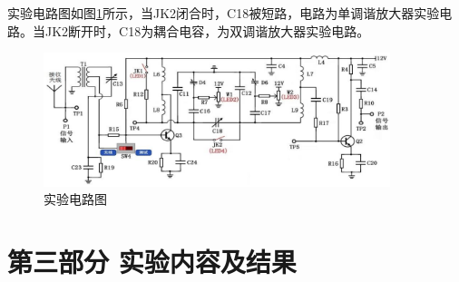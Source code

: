 \documentclass[UTF8]{ctexart}
\begin{document}
实验电路图如图\ref{fig:exp_circuit}所示，当JK2闭合时，C18被短路，电路为单调谐放大器实验电路。当JK2断开时，C18为耦合电容，为双调谐放大器实验电路。
\begin{figure}[H]
    \centering
    \includegraphics[width=0.9\textwidth]{pics/exp_circuit.png}
    \caption{实验电路图}\label{fig:exp_circuit}
\end{figure}




\section{第三部分 \texorpdfstring{\quad}{} 实验内容及结果}
\end{document}
